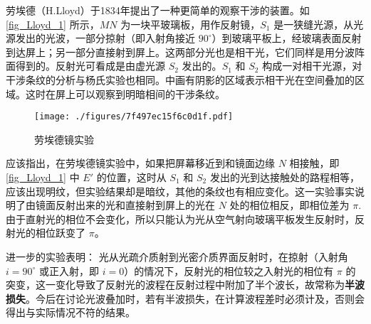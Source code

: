

劳埃德（H.Lloyd）于1834年提出了一种更简单的观察干涉的装置。如\autoref{fig_Lloyd_1} 所示，$MN $ 为一块平玻璃板，用作反射镜，$S_1$ 是一狭缝光源，从光源发出的光波，一部分掠射（即入射角接近 $90^\circ$）到玻璃平板上，经玻璃表面反射到达屏上；另一部分直接射到屏上。这两部分光也是相干光，它们同样是用分波阵面得到的。反射光可看成是由虚光源 $S_2 $ 发出的。$S_1$ 和 $S_2 $ 构成一对相干光源，对干涉条纹的分析与杨氏实验也相同。中画有阴影的区域表示相干光在空间叠加的区域。这时在屏上可以观察到明暗相间的干涉条纹。
\begin{figure}[ht]
\centering
\texttt{[image: ./figures/7f497ec15f6c0d1f.pdf]}
\caption{劳埃德镜实验} \label{fig_Lloyd_1}
\end{figure}
应该指出，在劳埃德镜实验中，如果把屏幕移近到和镜面边缘 $N $ 相接触，即\autoref{fig_Lloyd_1} 中 $E' $ 的位置，这时从 $S_1$ 和 $S_2$ 发出的光到达接触处的路程相等，应该出现明纹，但实验结果却是暗纹，其他的条纹也有相应变化。这一实验事实说明了由镜面反射出来的光和直接射到屏上的光在 $N $ 处的相位相反，即相位差为 $\pi$. 由于直射光的相位不会变化，所以只能认为光从空气射向玻璃平板发生反射时，反射光的相位跃变了 $\pi$。

进一步的实验表明： 光从光疏介质射到光密介质界面反射时，在掠射（入射角 $i=90^\circ$ 或正入射，即 $i = 0$）的情况下，反射光的相位较之入射光的相位有 $\pi$ 的突变，这一变化导致了反射光的波程在反射过程中附加了半个波长，故常称为\textbf{半波损失}。今后在讨论光波叠加时，若有半波损失，在计算波程差时必须计及，否则会得出与实际情况不符的结果。

